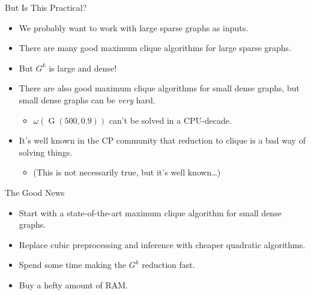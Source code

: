 \documentclass{beamer}
\begin{document}
\begin{frame}{But Is This Practical?}
    \begin{itemize}
        \item We probably want to work with large sparse graphs as inputs.
        \item There are many good maximum clique algorithms for large sparse graphs.
        \item But $G^k$ is large and dense!
        \item There are also good maximum clique algorithms for small dense graphs, but small dense
            graphs can be \emph{very} hard.
            \begin{itemize}
                \item $\omega(\operatorname{G}(500, 0.9))$ can't be solved in a CPU-decade.
            \end{itemize}
        \item It's well known in the CP community that reduction to clique is a bad way of solving
            things.
            \begin{itemize}
                \item (This is not necessarily true, but it's well known\ldots)
            \end{itemize}
    \end{itemize}
\end{frame}

\begin{frame}{The Good News}
    \begin{itemize}
        \item Start with a state-of-the-art maximum clique algorithm for small dense graphs.
        \item Replace cubic preprocessing and inference with cheaper quadratic algorithms.
        \item Spend some time making the $G^k$ reduction fast.
        \item Buy a hefty amount of RAM.
    \end{itemize}
\end{frame}
\end{document}
